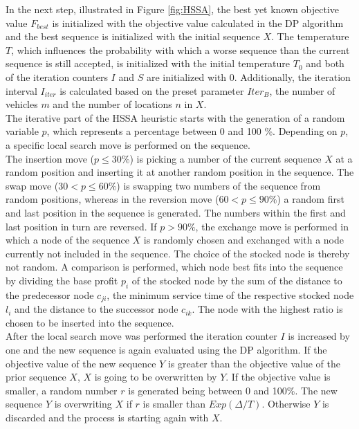 \documentclass[final,5p,times,twocolumn]{elsarticle}
\begin{document}
{{In the next step, illustrated in Figure \ref{fig:HSSA}, the best yet known objective value $F_{best}$ is initialized with the objective value calculated in the DP algorithm and the best sequence is initialized with the initial sequence $X$. The temperature $T$, which influences the probability with which a worse sequence than the current sequence is still accepted, is initialized with the initial temperature $T_{0}$ and both of the iteration counters $I$ and $S$ are initialized with 0. Additionally, the iteration interval $I_{iter}$ is calculated based on the preset parameter $Iter_{B}$, the number of vehicles $m$ and the number of locations $n$ in $X$.\\
The iterative part of the HSSA heuristic starts with the generation of a random variable $p$, which represents a percentage between 0 and 100 \%. Depending on $p$, a specific local search move is performed on the sequence. \\
The insertion move ($p \leq 30\%$) is picking a number of the current sequence $X$ at a random position and inserting it at another random position in the sequence. The swap move ($30 < p \leq 60\%$) is swapping two numbers of the sequence from random positions, whereas in the reversion move ($60 < p \leq 90\%$) a random first and last position in the sequence is generated. The numbers within the first and last position in turn are reversed. If $p > 90\%$, the exchange move is performed in which a node of the sequence $X$ is randomly chosen and exchanged with a node currently not included in the sequence. The choice of the stocked node is thereby not random. A comparison is performed, which node best fits into the sequence by dividing the base profit $p_{i}$ of the stocked node by the sum of the distance to the predecessor node $c_{ji}$, the minimum service time of the respective stocked node $l_{i}$ and the distance to the successor node $c_{ik}$. The node with the highest ratio is chosen to be inserted into the sequence.\\
After the local search move was performed the iteration counter $I$ is increased by one and the new sequence is again evaluated using the DP algorithm. If the objective value of the new sequence $Y$ is greater than the objective value of the prior sequence $X$, $X$ is going to be overwritten by $Y$. If the objective value is smaller, a random number $r$ is generated being between 0 and 100\%. The new sequence $Y$ is overwriting $X$ if $r$ is smaller than $Exp(\Delta/T)$. Otherwise $Y$ is discarded and the process is starting again with $X$. \\
}}
\end{document}
